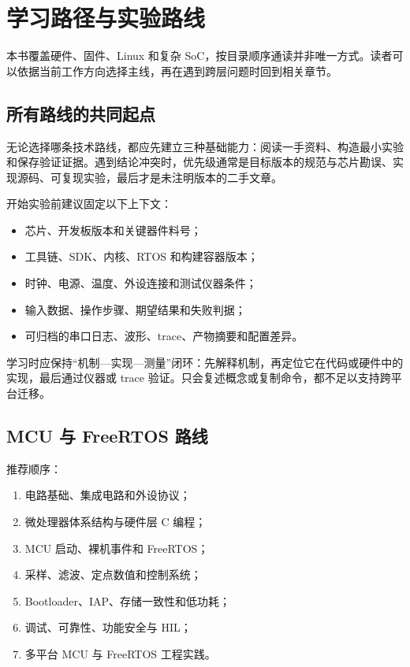 \chapter{学习路径与实验路线}
\label{chap:learning-paths}

本书覆盖硬件、固件、Linux 和复杂 SoC，按目录顺序通读并非唯一方式。读者可以依据当前工作方向选择主线，再在遇到跨层问题时回到相关章节。

\section{所有路线的共同起点}

无论选择哪条技术路线，都应先建立三种基础能力：阅读一手资料、构造最小实验和保存验证证据。遇到结论冲突时，优先级通常是目标版本的规范与芯片勘误、实现源码、可复现实验，最后才是未注明版本的二手文章。

开始实验前建议固定以下上下文：
\begin{itemize}
  \item 芯片、开发板版本和关键器件料号；
  \item 工具链、SDK、内核、RTOS 和构建容器版本；
  \item 时钟、电源、温度、外设连接和测试仪器条件；
  \item 输入数据、操作步骤、期望结果和失败判据；
  \item 可归档的串口日志、波形、trace、产物摘要和配置差异。
\end{itemize}

学习时应保持“机制---实现---测量”闭环：先解释机制，再定位它在代码或硬件中的实现，最后通过仪器或 trace 验证。只会复述概念或复制命令，都不足以支持跨平台迁移。

\section{MCU 与 FreeRTOS 路线}

推荐顺序：
\begin{enumerate}
  \item 电路基础、集成电路和外设协议；
  \item 微处理器体系结构与硬件层 C 编程；
  \item MCU 启动、裸机事件和 FreeRTOS；
  \item 采样、滤波、定点数值和控制系统；
  \item Bootloader、IAP、存储一致性和低功耗；
  \item 调试、可靠性、功能安全与 HIL；
  \item 多平台 MCU 与 FreeRTOS 工程实践。
\end{enumerate}

